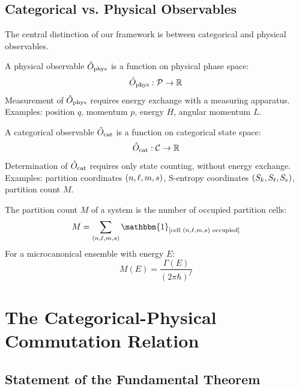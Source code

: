 \subsection{Categorical vs. Physical Observables}

The central distinction of our framework is between categorical and physical observables.

\begin{definition}
\label{def:physical_observable}
A physical observable $\hat{O}_{\mathrm{phys}}$ is a function on physical phase space:
\begin{equation}
\hat{O}_{\mathrm{phys}}: \mathcal{P} \to \mathbb{R}
\end{equation}
Measurement of $\hat{O}_{\mathrm{phys}}$ requires energy exchange with a measuring apparatus. Examples: position $q$, momentum $p$, energy $H$, angular momentum $L$.
\end{definition}

\begin{definition}
\label{def:categorical_observable}
A categorical observable $\hat{O}_{\mathrm{cat}}$ is a function on categorical state space:
\begin{equation}
\hat{O}_{\mathrm{cat}}: \mathcal{C} \to \mathbb{R}
\end{equation}
Determination of $\hat{O}_{\mathrm{cat}}$ requires only state counting, without energy exchange. Examples: partition coordinates $(n,\ell,m,s)$, S-entropy coordinates $(S_k,S_t,S_e)$, partition count $M$.
\end{definition}

\begin{definition}
\label{def:partition_count}
The partition count $M$ of a system is the number of occupied partition cells:
\begin{equation}
M = \sum_{\partcoord} \mathbbm{1}_{[\text{cell } \partcoord \text{ occupied}]}
\end{equation}
For a microcanonical ensemble with energy $E$:
\begin{equation}
M(E) = \frac{\Gamma(E)}{(2\pi\hbar)^f}
\label{eq:partition_count}
\end{equation}
\end{definition}

\section{The Categorical-Physical Commutation Relation}

\subsection{Statement of the Fundamental Theorem}

